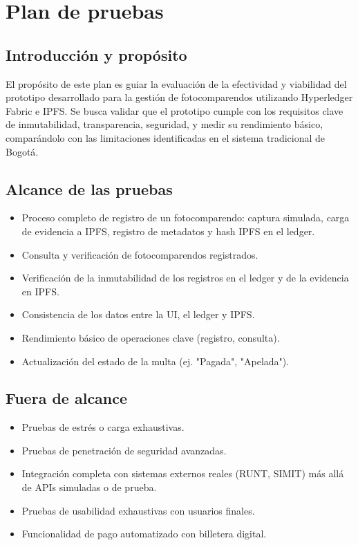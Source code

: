 \section{Plan de pruebas}

\subsection{Introducción y propósito}
El propósito de este plan es guiar la evaluación de la efectividad y viabilidad del prototipo desarrollado para la gestión de fotocomparendos utilizando Hyperledger Fabric e IPFS. Se busca validar que el prototipo cumple con los requisitos clave de inmutabilidad, transparencia, seguridad, y medir su rendimiento básico, comparándolo con las limitaciones identificadas en el sistema tradicional de Bogotá.

\subsection{Alcance de las pruebas}
\begin{itemize}
    \item Proceso completo de registro de un fotocomparendo: captura simulada, carga de evidencia a IPFS, registro de metadatos y hash IPFS en el ledger.
    \item Consulta y verificación de fotocomparendos registrados.
    \item Verificación de la inmutabilidad de los registros en el ledger y de la evidencia en IPFS.
    \item Consistencia de los datos entre la UI, el ledger y IPFS.
    \item Rendimiento básico de operaciones clave (registro, consulta).
    \item Actualización del estado de la multa (ej. "Pagada", "Apelada").
\end{itemize}

\subsection{Fuera de alcance}
\begin{itemize}
    \item Pruebas de estrés o carga exhaustivas.
    \item Pruebas de penetración de seguridad avanzadas.
    \item Integración completa con sistemas externos reales (RUNT, SIMIT) más allá de APIs simuladas o de prueba.
    \item Pruebas de usabilidad exhaustivas con usuarios finales.
    \item Funcionalidad de pago automatizado con billetera digital.
\end{itemize}

